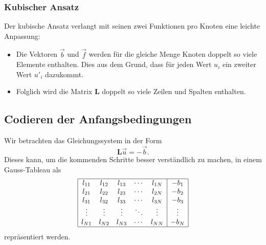 \subsubsection{Kubischer Ansatz}
Der kubische Ansatz verlangt mit seinen zwei Funktionen pro Knoten eine leichte Anpassung: 
\begin{itemize}
    \item Die Vektoren $\vec{b}$ und $\vec{f}$ werden für die gleiche Menge Knoten doppelt so viele Elemente enthalten.
          Dies aus dem Grund, dass für jeden Wert $u_i$ ein zweiter Wert $u'_i$ dazukommt.
    \item Folglich wird die Matrix $\mathbf{L}$ doppelt so viele Zeilen und Spalten enthalten. 
\end{itemize}


\subsection{Codieren der Anfangsbedingungen\label{fem:1d:anfangsbedingungen}}
Wir betrachten das Gleichungssystem in der Form 
\begin{equation}
    \mathbf{L}\vec{u} = -\vec{b}. 
    \label{fem:1d:gleichungssystem}
\end{equation}
Dieses kann, um die kommenden Schritte besser verständlich zu machen, in einem Gauss-Tableau als
\begin{equation*}
    \begin{array}{|ccccc|c|}
        \hline
        l_{11} & l_{12} & l_{13} & \cdots & l_{1N} & -b_1   \\
        l_{21} & l_{22} & l_{23} & \cdots & l_{2N} & -b_2   \\
        l_{31} & l_{32} & l_{33} & \cdots & l_{3N} & -b_3   \\
        \vdots & \vdots & \vdots & \ddots & \vdots & \vdots \\
        l_{N1} & l_{N2} & l_{N3} & \cdots & l_{NN} & -b_N   \\
        \hline
    \end{array}
\end{equation*}
repräsentiert werden.


